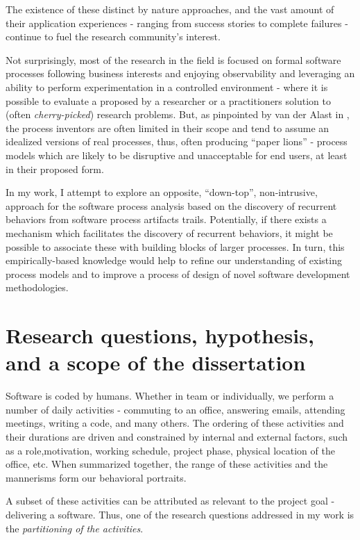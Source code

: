 The existence of these distinct by nature approaches, and the vast amount of their application experiences -
ranging from success stories to complete failures - continue to fuel the research community's interest. 

Not surprisingly, most of the research in the field is focused on formal software processes following business 
interests and enjoying observability and leveraging an ability to perform experimentation in a controlled environment -
where it is possible to evaluate a proposed by a researcher or a practitioners solution to 
(often \textit{cherry-picked}) research problems. 
But, as pinpointed by van der Alast in \cite{citeulike:9758924}, the process inventors are often limited in their
scope and tend to assume an idealized versions of real processes, thus, often producing ``paper lions'' - 
process models which are likely to be disruptive and unacceptable for end users, at least in their proposed form.

In my work, I attempt to explore an opposite, ``down-top'', non-intrusive, approach for the software 
process analysis based on the discovery of recurrent behaviors from software process artifacts trails. 
Potentially, if there exists a mechanism which facilitates the discovery of recurrent behaviors, 
it might be possible to associate these with building blocks of larger processes. In turn, this empirically-based 
knowledge would help to refine our understanding of existing process models and to improve a process of 
design of novel software development methodologies.

\section{Research questions, hypothesis, and a scope of the dissertation}
Software is coded by humans. Whether in team or individually, we perform a number of daily activities - 
commuting to an office, answering emails, attending meetings, writing a code, and many others. 
The ordering of these activities and their durations are driven and constrained by internal and external factors, 
such as a role,motivation, working schedule, project phase, physical location of the office, etc. 
When summarized together, the range of these activities and the mannerisms form our behavioral portraits.

A subset of these activities can be attributed as relevant to the project goal - delivering a software. 
Thus, one of the research questions addressed in my work is the \textit{partitioning of the activities}. 

